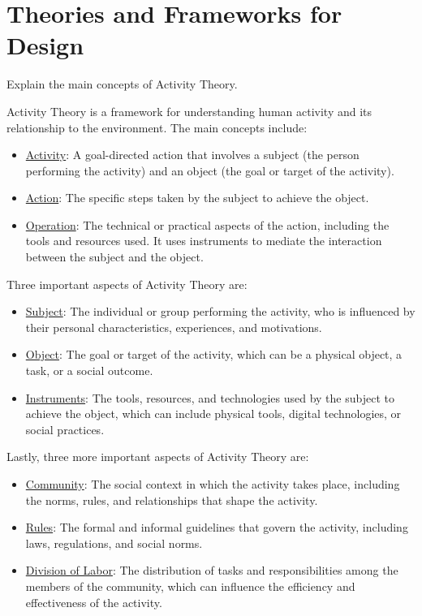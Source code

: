 \section{Theories and Frameworks for Design}


\begin{ejercicio}
    Explain the main concepts of Activity Theory.

    Activity Theory is a framework for understanding human activity and its relationship to the environment. The main concepts include:
    \begin{itemize}
        \item \ul{Activity}: A goal-directed action that involves a subject (the person performing the activity) and an object (the goal or target of the activity).
        \item \ul{Action}: The specific steps taken by the subject to achieve the object.
        \item \ul{Operation}: The technical or practical aspects of the action, including the tools and resources used. It uses instruments to mediate the interaction between the subject and the object.
    \end{itemize}

    Three important aspects of Activity Theory are:
    \begin{itemize}
        \item \ul{Subject}: The individual or group performing the activity, who is influenced by their personal characteristics, experiences, and motivations.
        \item \ul{Object}: The goal or target of the activity, which can be a physical object, a task, or a social outcome.
        \item \ul{Instruments}: The tools, resources, and technologies used by the subject to achieve the object, which can include physical tools, digital technologies, or social practices.
    \end{itemize}

    Lastly, three more important aspects of Activity Theory are:
    \begin{itemize}
        \item \ul{Community}: The social context in which the activity takes place, including the norms, rules, and relationships that shape the activity.
        \item \ul{Rules}: The formal and informal guidelines that govern the activity, including laws, regulations, and social norms.
        \item \ul{Division of Labor}: The distribution of tasks and responsibilities among the members of the community, which can influence the efficiency and effectiveness of the activity.
    \end{itemize}
\end{ejercicio}

